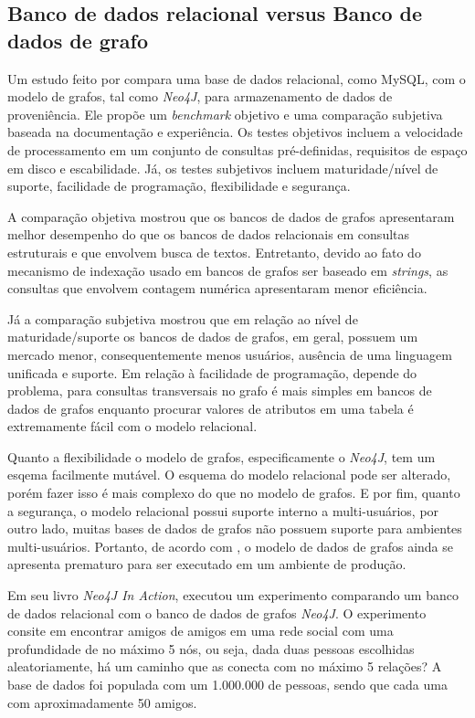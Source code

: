\subsection{Banco de dados relacional versus Banco de dados de grafo}

Um estudo feito por \cite{chad} compara uma base de dados relacional, como MySQL, com o modelo de grafos, tal como \textit{Neo4J}, para armazenamento de dados de proveniência. Ele propõe um \textit{benchmark} objetivo e uma comparação subjetiva baseada na documentação e experiência. Os testes objetivos incluem a velocidade de processamento em um conjunto de consultas pré-definidas, requisitos de espaço em disco e escabilidade. Já, os testes subjetivos incluem maturidade/nível de suporte, facilidade de programação, flexibilidade e segurança.

A comparação objetiva mostrou que os bancos de dados de grafos apresentaram melhor desempenho do que os bancos de dados relacionais em consultas estruturais e que envolvem busca de textos. Entretanto, devido ao fato do mecanismo de indexação usado em bancos de grafos ser baseado em \textit{strings}, as consultas que envolvem contagem numérica apresentaram menor eficiência.

Já a comparação subjetiva mostrou que em relação ao nível de maturidade/suporte os bancos de dados de grafos, em geral, possuem um mercado menor, consequentemente menos usuários, ausência de uma linguagem unificada e suporte. Em relação à facilidade de programação, depende do problema, para consultas transversais no grafo é mais simples em bancos de dados de grafos enquanto procurar valores de atributos em uma tabela é extremamente fácil com o modelo relacional.

Quanto a flexibilidade o modelo de grafos, especificamente o \textit{Neo4J}, tem um esqema facilmente mutável. O esquema do modelo relacional pode ser alterado, porém fazer isso é mais complexo do que no modelo de grafos. E por fim, quanto a segurança, o modelo relacional possui suporte interno a multi-usuários, por outro lado, muitas bases de dados de grafos não possuem suporte para ambientes multi-usuários. Portanto, de acordo com \cite{chad}, o modelo de dados de grafos ainda se apresenta prematuro para ser executado em um ambiente de produção.

Em seu livro \textit{Neo4J In Action}, \cite{partner2013neo4j} executou um experimento comparando um banco de dados relacional com o banco de dados de grafos \textit{Neo4J}. O experimento consite em encontrar amigos de amigos em uma rede social com uma profundidade de no máximo 5 nós, ou seja, dada duas pessoas escolhidas aleatoriamente, há um caminho que as conecta com no máximo 5 relações? A base de dados foi populada com um 1.000.000 de pessoas, sendo que cada uma com aproximadamente 50 amigos.

